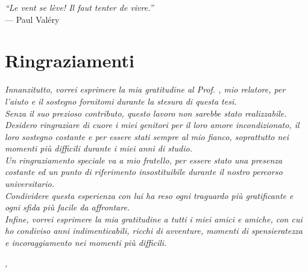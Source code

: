 \cleardoublepage
{}
{}

\begin{flushright}
    {
    \slshape
    ``Le vent se lève!  Il faut tenter de vivre.''} \\
    \medskip
    --- Paul Valéry
\end{flushright}


\bigskip

\begingroup
\let\clearpage\relax
\let\cleardoublepage\relax
\let\cleardoublepage\relax

\chapter*{Ringraziamenti}

\noindent \textit{Innanzitutto, vorrei esprimere la mia gratitudine al Prof. \myProf, mio relatore, per l'aiuto e il sostegno fornitomi durante la stesura di questa tesi.\\
Senza il suo prezioso contributo, questo lavoro non sarebbe stato realizzabile.}\\

\noindent \textit{Desidero ringraziare di cuore i miei genitori per il loro amore incondizionato, il loro sostegno costante e per essere stati sempre al mio fianco, soprattutto nei momenti più difficili durante i miei anni di studio.}\\

\noindent \textit{Un ringraziamento speciale va a mio fratello, per essere stato una presenza costante ed un punto di riferimento insostituibile durante il nostro percorso universitario. \\
Condividere questa esperienza con lui ha reso ogni traguardo più gratificante e ogni sfida più facile da affrontare.}\\

\noindent \textit{Infine, vorrei esprimere la mia gratitudine a tutti i miei amici e amiche, con cui ho condiviso anni indimenticabili, ricchi di avventure, momenti di spensieratezza e incoraggiamento nei momenti più difficili.}\
\bigskip

\noindent\textit{\myLocation, \myTime}
\hfill \myName

\endgroup
